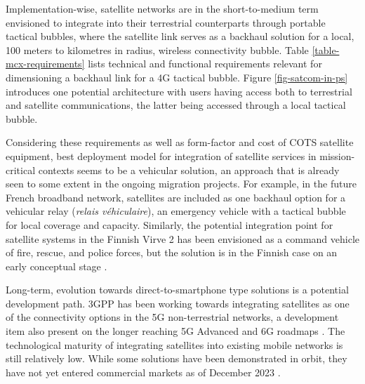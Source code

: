 \documentclass[english, 12pt, a4paper, elec, utf8, a-1b, online]{aaltothesis}
\begin{document}
Implementation-wise, satellite networks are in the short-to-medium term envisioned to integrate into their terrestrial counterparts through portable tactical bubbles, where the satellite link serves as a backhaul solution for a local, 100 meters to kilometres in radius, wireless connectivity bubble.
Table \ref{table-mcx-requirements} lists technical and functional requirements relevant for dimensioning a backhaul link for a 4G tactical bubble. Figure \ref{fig-satcom-in-ps} introduces one potential architecture with users having access both to terrestrial and satellite communications, the latter being accessed through a local tactical bubble.

Considering these requirements as well as form-factor and cost of COTS satellite equipment, best deployment model for integration of satellite services in mission-critical contexts seems to be a vehicular solution, an approach that is already seen to some extent in the ongoing migration projects.
For example, in the future French broadband network, satellites are included as one backhaul option for a vehicular relay (\textit{relais véhiculaire}), an emergency vehicle with a tactical bubble for local coverage and capacity.
Similarly, the potential integration point for satellite systems in the Finnish Virve 2 has been envisioned as a command vehicle of fire, rescue, and police forces, but the solution is in the Finnish case on an early conceptual stage \cite{kokkoniemitarkkanen2024missioncritical,saynevirta2021satellite,dominguez2021resilience}.

Long-term, evolution towards direct-to-smartphone type solutions is a potential development path. 3GPP has been working towards integrating satellites as one of the connectivity options in the 5G non-terrestrial networks, a development item also present on the longer reaching 5G Advanced and 6G roadmaps \cite{ray2021perspective, jiang2021road}. The technological maturity of integrating satellites into existing mobile networks is still relatively low. While some solutions have been demonstrated in orbit, they have not yet entered commercial markets as of December 2023 \cite{sn-2023-09-19-ast, sn-2023-11-07-lynk, 5g-americas-update-on-5g-ntn, jain2023rel18}.
\end{document}
